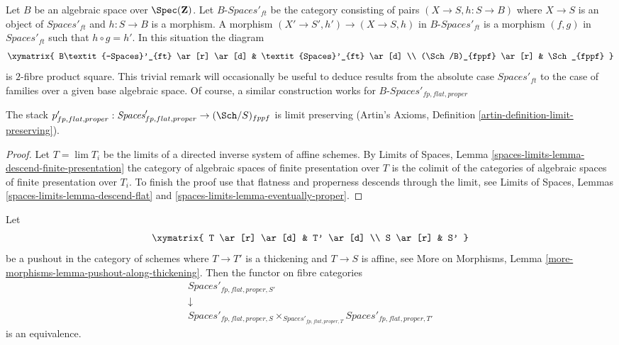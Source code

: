 \begin{remark}
\label{remark-spaces-base-change}
Let $B$ be an algebraic space over $\Spec(\mathbf{Z})$.
Let $B\textit{-Spaces}'_{ft}$ be the category consisting
of pairs $(X \to S, h : S \to B)$
where $X \to S$ is an object of
$\textit{Spaces}'_{ft}$ and $h : S \to B$ is a morphism.
A morphism $(X' \to S', h') \to (X \to S, h)$
in $B\textit{-Spaces}'_{ft}$ is a morphism $(f, g)$
in $\textit{Spaces}'_{ft}$ such that $h \circ g = h'$.
In this situation the diagram
$$
\xymatrix{
B\textit{-Spaces}'_{ft} \ar[r] \ar[d] & \textit{Spaces}'_{ft} \ar[d] \\
(\Sch/B)_{fppf} \ar[r] & \Sch_{fppf}
}
$$
is $2$-fibre product square. This trivial remark
will occasionally be useful to deduce results from
the absolute case $\textit{Spaces}'_{ft}$ to the case
of families over a given base algebraic space.
Of course, a similar construction works for
$B\textit{-Spaces}'_{fp, flat, proper}$
\end{remark}

\begin{lemma}
\label{lemma-spaces-limits}
The stack
$p'_{fp, flat, proper} :
\textit{Spaces}'_{fp, flat, proper} \to (\Sch/S)_{fppf}$ is limit preserving
(Artin's Axioms, Definition \ref{artin-definition-limit-preserving}).
\end{lemma}

\begin{proof}
Let $T = \lim T_i$ be the limits of a
directed inverse system of affine schemes.
By Limits of Spaces, Lemma
\ref{spaces-limits-lemma-descend-finite-presentation}
the category of algebraic spaces of finite presentation
over $T$ is the colimit of the categories of algebraic spaces
of finite presentation over $T_i$.
To finish the proof use that flatness and properness
descends through the limit, see
Limits of Spaces, Lemmas
\ref{spaces-limits-lemma-descend-flat} and
\ref{spaces-limits-lemma-eventually-proper}.
\end{proof}

\begin{lemma}
\label{lemma-spaces-RS-star}
Let
$$
\xymatrix{
T \ar[r] \ar[d] & T' \ar[d] \\
S \ar[r] & S'
}
$$
be a pushout in the category of schemes where
$T \to T'$ is a thickening and $T \to S$ is affine, see
More on Morphisms, Lemma \ref{more-morphisms-lemma-pushout-along-thickening}.
Then the functor on fibre categories
$$
\begin{matrix}
\textit{Spaces}'_{fp, flat, proper, S'} \\
\downarrow \\
\textit{Spaces}'_{fp, flat, proper, S}
\times_{\textit{Spaces}'_{fp, flat, proper, T}}
\textit{Spaces}'_{fp, flat, proper, T'}
\end{matrix}
$$
is an equivalence.
\end{lemma}

